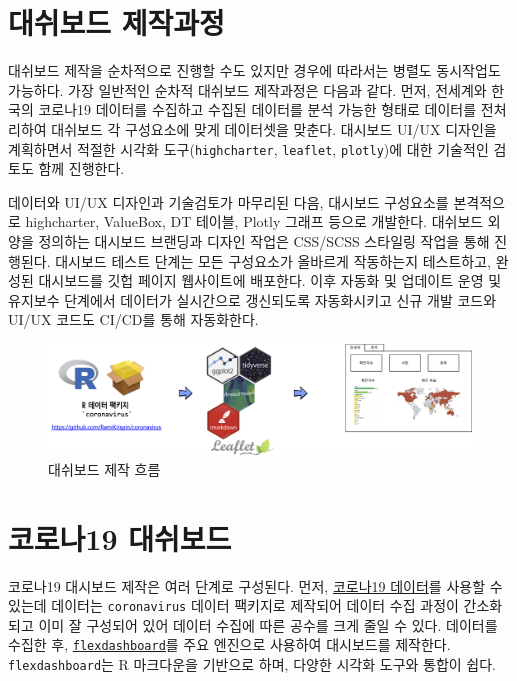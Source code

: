 \documentclass[
  letterpaper,
]{book}
\begin{document}
\hypertarget{uxb300uxc26cuxbcf4uxb4dc-uxc81cuxc791uxacfcuxc815}{%
\section{대쉬보드
제작과정}\label{uxb300uxc26cuxbcf4uxb4dc-uxc81cuxc791uxacfcuxc815}}

대쉬보드 제작을 순차적으로 진행할 수도 있지만 경우에 따라서는 병렬도
동시작업도 가능하다. 가장 일반적인 순차적 대쉬보드 제작과정은 다음과
같다. 먼저, 전세계와 한국의 코로나19 데이터를 수집하고 수집된 데이터를
분석 가능한 형태로 데이터를 전처리하여 대쉬보드 각 구성요소에 맞게
데이터셋을 맞춘다. 대시보드 UI/UX 디자인을 계획하면서 적절한 시각화
도구(\texttt{highcharter}, \texttt{leaflet}, \texttt{plotly})에 대한
기술적인 검토도 함께 진행한다. \autocite{kulkarni2019building}

데이터와 UI/UX 디자인과 기술검토가 마무리된 다음, 대시보드 구성요소를
본격적으로 highcharter, ValueBox, DT 테이블, Plotly 그래프 등으로
개발한다. 대쉬보드 외양을 정의하는 대시보드 브랜딩과 디자인 작업은
CSS/SCSS 스타일링 작업을 통해 진행된다. 대시보드 테스트 단계는 모든
구성요소가 올바르게 작동하는지 테스트하고, 완성된 대시보드를 깃헙 페이지
웹사이트에 배포한다. 이후 자동화 및 업데이트 운영 및 유지보수 단계에서
데이터가 실시간으로 갱신되도록 자동화시키고 신규 개발 코드와 UI/UX
코드도 CI/CD를 통해 자동화한다.

\begin{figure}

{\centering \includegraphics{images/corona-flexdashboard.png}

}

\caption{대쉬보드 제작 흐름}

\end{figure}

\hypertarget{corona-virus-dashboard}{%
\section{코로나19 대쉬보드}\label{corona-virus-dashboard}}

코로나19 대시보드 제작은 여러 단계로 구성된다. 먼저,
\href{https://github.com/RamiKrispin/coronavirus}{코로나19 데이터}를
사용할 수 있는데 데이터는 \texttt{coronavirus} 데이터 팩키지로 제작되어
데이터 수집 과정이 간소화되고 이미 잘 구성되어 있어 데이터 수집에 따른
공수를 크게 줄일 수 있다. 데이터를 수집한 후,
\href{https://rmarkdown.rstudio.com/flexdashboard/}{\texttt{flexdashboard}}를
주요 엔진으로 사용하여 대시보드를 제작한다. \texttt{flexdashboard}는 R
마크다운을 기반으로 하며, 다양한 시각화 도구와 통합이 쉽다.
\end{document}
